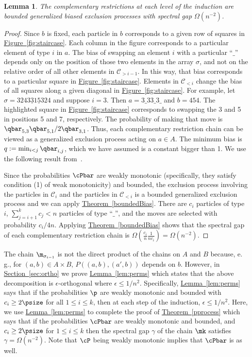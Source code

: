 \documentclass[11pt]{article}
\newtheorem{lemma}[theorem]{Lemma}
\providecommand{\eg}{e.\,g.}
\providecommand{\expref}[2]{\texorpdfstring{\hyperref[#2]{#1~\ref{#2}}}{#1~\ref{#2}}}
\begin{document}
\begin{lemma}\label{lem:dual}
The complementary restrictions at each level of the induction are 
bounded generalized biased exclusion processes with spectral gap 
$\Omega(n^{-2})$.
\end{lemma}
\begin{proof}
Since $b$ is fixed, each particle in $b$ corresponds to a given row of 
squares in \expref{Figure}{fig:staircase}.  Each column in the figure 
corresponds to a particular element of type $i$ in $a$.  The bias of 
swapping an element $i$ with a particular ``$\_$'' depends only on the 
position of those two elements in the array $\sigma$, and not on the 
relative order of all other elements in $\mathcal{C}_{> i-1}$.  In 
this way, that bias corresponds to a particular square in 
\expref{Figure}{fig:staircase}.  Elements in $\mathcal{C}_{<i}$ change the 
bias of all squares along a given diagonal in 
\expref{Figure}{fig:staircase}.  For example, let $\sigma = 
3243\underline{3}1\underline{5}324$ and suppose $i=3$.  Then 
$a=3\_33\_3\_$ and $b=454$.  The highlighted square in 
\expref{Figure}{fig:staircase} corresponds to swapping the 3 and 5 in 
positions 5 and 7, respectively.  The probability of making that move 
is $\qbar_{5,3}\qbar_{5,1}/2\qbar_{3,1}$.  Thus, each complementary 
restriction chain can be viewed as a generalized exclusion process 
acting on $a\in A$.  The minimum bias is $q:=\min_{i<j} \qbar_{i,j}$, 
which we have assumed is a constant bigger than 1. We use the following 
result from~\cite{MS}.


\noindent Since the probabilities $\cPbar$ are weakly monotonic 
(specifically, they satisfy condition (1) of weak monotonicity) and 
bounded, the exclusion process involving the particles in 
$\mathcal{C}_{i}$ and the particles in $\mathcal{C}_{<i}$ is a 
bounded generalized exclusion process and we can apply 
\expref{Theorem}{boundedBias}.  There are $c_i$ particles of type $i$, 
$\sum_{j=i+1}^k c_j < n$ particles of type ``$\_$'', and the moves are 
selected with probability $c_i/4n$.  Applying 
\expref{Theorem}{boundedBias} shows that the spectral gap of each 
complementary restriction chain is 
$\Omega(\frac{c_{i}}{n}\frac{1}{nc_{i}})=\Omega(n^{-2})$. \end{proof}


The chain $\m_{\sigma_{i-1}}$ is not the direct product of the chains 
on $A$ and $B$ because, \eg, for $(a,b) \in A\times B$, 
$P((a,b),(a',b))$ depends on $b$. However, in \expref{Section}{sec:ortho} 
we prove \expref{Lemma}{lem:perms} which states that the above 
decomposition is 
%
$\epsilon$-orthogonal where $\epsilon\leq 1/n^2$.%
Specifically, \expref{Lemma}{lem:perms} says that if the probabilities $\p$ are weakly monotonic and bounded with 
$c_i\geq 2\psize$ for all $1\leq i \leq k$, then at each step of 
the induction, %
$\epsilon\leq 1/n^2$. %
Here, we use 
\expref{Lemma}{lem:perms} to complete the proof of \expref{Theorem}{pprocess} 
which says that if the probabilities $\cPbar$ are weakly monotonic and 
bounded, and  $c_i\geq 2\psize$ for $1\leq i \leq k$ then the spectral 
gap $\gamma$ 
of the chain $\mk$ satisfies $\gamma =\Omega(n^{-2})$.  Note that
$\cP$ being weakly monotonic implies that $\cPbar$ is as well.
%
\end{document}
